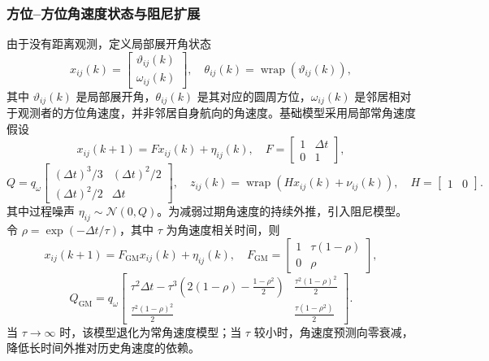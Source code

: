 \documentclass[UTF8,fontset=windows,11pt]{ctexart}
\begin{document}
\subsubsection{方位--方位角速度状态与阻尼扩展}
由于没有距离观测，定义局部展开角状态
\begin{equation}
 x_{ij}(k)=\begin{bmatrix}\vartheta_{ij}(k)\\ \omega_{ij}(k)\end{bmatrix},
 \quad \theta_{ij}(k)=\operatorname{wrap}(\vartheta_{ij}(k)),
\end{equation}
其中 $\vartheta_{ij}(k)$ 是局部展开角，$\theta_{ij}(k)$ 是其对应的圆周方位，$\omega_{ij}(k)$ 是邻居相对于观测者的方位角速度，并非邻居自身航向的角速度。基础模型采用局部常角速度假设
\begin{equation}
 x_{ij}(k+1)=F x_{ij}(k)+\eta_{ij}(k),
 \quad F=\begin{bmatrix}1&\Delta t\\0&1\end{bmatrix},
\end{equation}
\begin{equation}
 Q=q_\omega\begin{bmatrix}(\Delta t)^3/3&(\Delta t)^2/2\\(\Delta t)^2/2&\Delta t\end{bmatrix},
 \quad z_{ij}(k)=\operatorname{wrap}(Hx_{ij}(k)+\nu_{ij}(k)),\quad H=\begin{bmatrix}1&0\end{bmatrix}.
\end{equation}
其中过程噪声 $\eta_{ij}\sim\mathcal N(0,Q)$。为减弱过期角速度的持续外推，引入阻尼模型。令
$\rho=\exp(-\Delta t/\tau)$，其中 $\tau$ 为角速度相关时间，则
\begin{equation}
 x_{ij}(k+1)=F_{\mathrm{GM}}x_{ij}(k)+\eta_{ij}(k),
 \quad
 F_{\mathrm{GM}}=\begin{bmatrix}1&\tau(1-\rho)\\0&\rho\end{bmatrix},
\end{equation}
\begin{equation}
 Q_{\mathrm{GM}}=q_\omega
 \begin{bmatrix}
 \tau^2\Delta t-\tau^3\left(2(1-\rho)-\frac{1-\rho^2}{2}\right)
 & \frac{\tau^2(1-\rho)^2}{2}\\[2mm]
 \frac{\tau^2(1-\rho)^2}{2}
 & \frac{\tau(1-\rho^2)}{2}
 \end{bmatrix}.
\end{equation}
当 $\tau\to\infty$ 时，该模型退化为常角速度模型；当 $\tau$ 较小时，角速度预测向零衰减，降低长时间外推对历史角速度的依赖。
\end{document}
